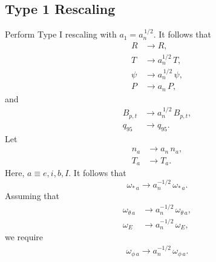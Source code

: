 \documentclass[12pt]{article}
\begin{document}
\subsection{Type 1 Rescaling}
Perform Type I rescaling with $a_1 =a_n^{\,1/2}$. It follows that 
\begin{align}
R&\rightarrow R,\\[0.5ex]
T&\rightarrow a_n^{1/2}\,T,\\[0.5ex]
\psi&\rightarrow a_n^{\,1/2}\,\psi,\\[0.5ex]
P&\rightarrow a_n\,P,
\end{align}
and 
\begin{align}
B_{p,t}&\rightarrow a_n^{\,1/2}\,B_{p,t},\\[0.5ex]
q_{95}&\rightarrow q_{95}.
\end{align}
Let
\begin{align}
n_a&\rightarrow a_n\,n_a,\\[0.5ex]
T_a&\rightarrow T_a.
\end{align}
Here, $a\equiv e, i, b, I$. 
It follows that
\begin{equation}
\omega_{\ast\,a} \rightarrow a_n^{-1/2}\,\omega_{\ast\,a}.
\end{equation}
Assuming that
\begin{align}
\omega_{\theta\,a}&\rightarrow a_n^{-1/2}\,\omega_{\theta\,a},\\[0.5ex]
\omega_E&\rightarrow a_n^{-1/2}\,\omega_E,
\end{align}
we require 
\begin{align}
\omega_{\phi\,a}\rightarrow  a_n^{-1/2}\,\omega_{\phi\,a}.
\end{align}
\end{document}
